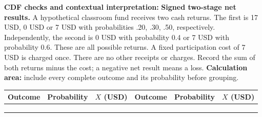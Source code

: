 \par
{}
\par%
\noindent%
\begin{minipage}[t]{.37\linewidth}%
  \vspace{0pt}\centering
\end{minipage}%
\hfill%
\begin{minipage}[t]{.60\linewidth}%
  \vspace{0pt}\centering
\end{minipage}%
\par
\textbf{CDF checks and contextual interpretation:}
\vfill
\clearpage
{}
\textbf{Signed two-stage net results.} A hypothetical classroom fund receives two cash returns. The first is
17 USD, 0 USD or 7 USD with probabilities .20, .30, .50, respectively. Independently, the second is 0 USD with
probability 0.4 or 7 USD with probability 0.6. These are all possible returns. A fixed participation cost of 7
USD is charged once. There are no other receipts or charges. Record the sum of both returns minus the cost; a
negative net result means a loss.
\textbf{Calculation area:} include every complete outcome and its probability before grouping.
\par%
\noindent%
\begin{tabularx}{\linewidth}{|Y|Y|Y|Y|Y|Y|}%
  \hline Outcome & Probability & $X$ (USD) & Outcome & Probability & $X$ (USD)\\%
  \hline
  \rule{0pt}{.63cm}& & & & & \\%
  \hline
  \rule{0pt}{.63cm}& & & & & \\%
  \hline
  \rule{0pt}{.63cm}& & & & & \\%
  \hline
\end{tabularx}
\par%
\noindent%
\begin{minipage}[t]{.37\linewidth}%
  \vspace{0pt}\centering
\end{minipage}%
\hfill%
\begin{minipage}[t]{.60\linewidth}%
  \vspace{0pt}\centering
\end{minipage}%
